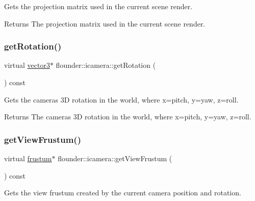 Gets the projection matrix used in the current scene render. 

\begin{DoxyReturn}{Returns}
The projection matrix used in the current scene render. 
\end{DoxyReturn}
\mbox{\label{classflounder_1_1icamera_a708d9b2cab040a78e522dc8a9864d959}} 
\subsubsection{\texorpdfstring{get\+Rotation()}{getRotation()}}
{\footnotesize\ttfamily virtual \hyperlink{classflounder_1_1vector3}{vector3}$\ast$ flounder\+::icamera\+::get\+Rotation (\begin{DoxyParamCaption}{ }\end{DoxyParamCaption}) const\hspace{0.3cm}{\ttfamily [pure virtual]}}



Gets the cameras 3D rotation in the world, where x=pitch, y=yaw, z=roll. 

\begin{DoxyReturn}{Returns}
The cameras 3D rotation in the world, where x=pitch, y=yaw, z=roll. 
\end{DoxyReturn}
\mbox{\label{classflounder_1_1icamera_a854ed7169c5514c18e0bb09e97dfcde6}} 
\subsubsection{\texorpdfstring{get\+View\+Frustum()}{getViewFrustum()}}
{\footnotesize\ttfamily virtual \hyperlink{classflounder_1_1frustum}{frustum}$\ast$ flounder\+::icamera\+::get\+View\+Frustum (\begin{DoxyParamCaption}{ }\end{DoxyParamCaption}) const\hspace{0.3cm}{\ttfamily [pure virtual]}}



Gets the view frustum created by the current camera position and rotation. 

